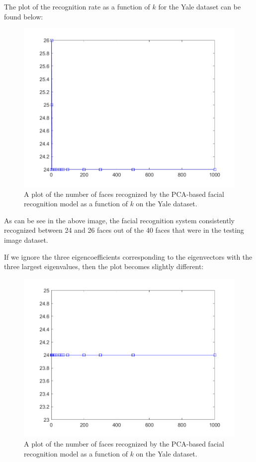 \documentclass[a4paper]{article}
\begin{document}
The plot of the recognition rate as a function of $k$ for the Yale dataset can be found below:
\begin{figure}[H]
	\centering
	\includegraphics[width=\textwidth]{recognition_rate_yale.png}
	\caption{A plot of the number of faces recognized by the PCA-based facial recognition model as a function of $k$ on the Yale dataset.}
\end{figure}

As can be see in the above image, the facial recognition system consistently recognized between 24 and 26 faces out of the 40 faces that were in the testing image dataset.

\bigskip
If we ignore the three eigencoefficients corresponding to the eigenvectors with the three largest eigenvalues, then the plot becomes slightly different:
\begin{figure}[H]
	\centering
	\includegraphics[width=\textwidth]{recognition_rate_yale_partial.png}
	\caption{A plot of the number of faces recognized by the PCA-based facial recognition model as a function of $k$ on the Yale dataset.}
\end{figure}
\end{document}
